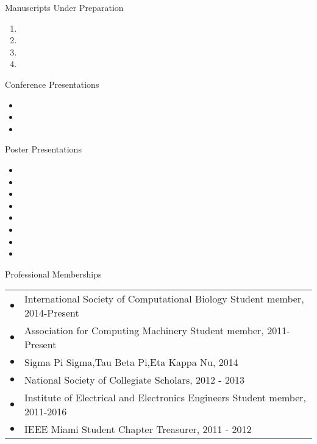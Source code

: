 \documentclass{resume} %
\begin{document}
\begin{rSection}{Manuscripts Under Preparation}
  \begin{enumerate}
    \item {}
    \item {}
    \item {}
    \item {}
  \end{enumerate}
\end{rSection}
\begin{rSection}{Conference Presentations}
  \begin{itemize}
    \item {}
    \item {}
    \item {}
  \end{itemize}
\end{rSection}
\begin{rSection}{Poster Presentations}
  \begin{itemize}
    \setlength\itemsep{0em}
    \item {}
    \item {}
    \item {}
    \item {}
    \item {}
    \item {}
    \item {}
    \item {}
  \end{itemize}
\end{rSection}

\begin{rSection}{Professional Memberships}
  \begin{tabular}{ll}
    $\bullet$ & International Society of Computational Biology Student member, 2014-Present\\
    $\bullet$ & Association for Computing Machinery Student member, 2011-Present \\
    $\bullet$ & Sigma Pi Sigma,Tau Beta Pi,Eta Kappa Nu, 2014 \\
    $\bullet$ & National Society of Collegiate Scholars, 2012 - 2013\\
    $\bullet$ & Institute of Electrical and Electronics Engineers Student member, 2011-2016 \\
    $\bullet$ & IEEE Miami Student Chapter Treasurer, 2011 - 2012\\
  \end{tabular}
\end{rSection}
\end{document}

